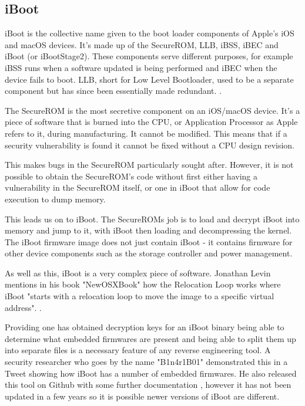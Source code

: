 \subsection{iBoot}

iBoot is the collective name given to the boot loader components of Apple's iOS and macOS devices. It's made up of the SecureROM, LLB, iBSS, iBEC and iBoot (or iBootStage2). These components serve different purposes, for example iBSS runs when a software updated is being performed and iBEC when the device fails to boot. LLB, short for Low Level Bootloader, used to be a separate component but has since been essentially made redundant. \cite{find-reference}.

The SecureROM is the most secretive component on an iOS/macOS device. It's a piece of software that is burned into the CPU, or Application Processor as Apple refers to it, during manufacturing. It cannot be modified. This means that if a security vulnerability is found it cannot be fixed without a CPU design revision.

This makes bugs in the SecureROM particularly sought after. However, it is not possible to obtain the SecureROM's code without first either having a vulnerability in the SecureROM itself, or one in iBoot that allow for code execution to dump memory. 

This leads us on to iBoot. The SecureROMs job is to load and decrypt iBoot into memory and jump to it, with iBoot then loading and decompressing the kernel. The iBoot firmware image does not just contain iBoot - it contains firmware for other device components such as the storage controller and power management. \cite{rasegen-github}

As well as this, iBoot is a very complex piece of software. Jonathan Levin mentions in his book "NewOSXBook" how the Relocation Loop works where iBoot "starts with a relocation loop to move the image to a specific virtual address". \cite{levin-newosxbook-iboot}. 

Providing one has obtained decryption keys for an iBoot binary being able to determine what embedded firmwares are present and being able to split them up into separate files is a necessary feature of any reverse engineering tool. A security researcher who goes by the name "B1n4r1B01" demonstrated this in a Tweet \cite{binaryboy-iboot-tweet} showing how iBoot has a number of embedded firmwares. He also released this tool on Github with some further documentation \cite{rasegen-github}, however it has not been updated in a few years so it is possible newer versions of iBoot are different.